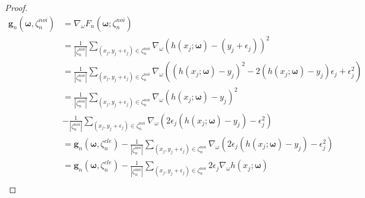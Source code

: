 \begin{proof}
\begin{equation}\label{Gradient of noise loss}
\begin{aligned}
\boldsymbol{g}_n\left(\boldsymbol{\omega},\zeta_n^{noi}\right)&=\nabla_\omega F_n\left(\boldsymbol{\omega};\zeta_n^{noi}\right)\\
&=\frac{1}{|\zeta_n^{noi}|}\sum_{\left(x_j,y_j+\epsilon_j\right)\in \zeta_n^{noi}} \nabla_\omega \left(h\left(x_j;\boldsymbol{\omega}\right)-\left(y_j+\epsilon_j\right)\right)^2\\
&=\frac{1}{|\zeta_n^{noi}|}\sum_{\left(x_j,y_j+\epsilon_j\right)\in \zeta_n^{noi}}\nabla_\omega \left(\left(h\left(x_j;\boldsymbol{\omega}\right)-y_j\right)^2-2\left(h\left(x_j;\boldsymbol{\omega}\right)-y_j\right)\epsilon_j+\epsilon_j^2\right)\\
&=\frac{1}{|\zeta_n^{noi}|}\sum_{\left(x_j,y_j+\epsilon_j\right)\in \zeta_n^{noi}}\nabla_\omega \left(h\left(x_j;\boldsymbol{\omega}\right)-y_j\right)^2\\
&-\frac{1}{|\zeta_n^{noi}|}\sum_{\left(x_j,y_j+\epsilon_j\right)\in \zeta_n^{noi}}\nabla_\omega \left(2\epsilon_j\left(h\left(x_j;\boldsymbol{\omega}\right)-y_j\right)-\epsilon_j^2\right)\\
&=\boldsymbol{g}_n\left(\boldsymbol{\omega},\zeta_n^{cle}\right)-\frac{1}{|\zeta_n^{noi}|}\sum_{\left(x_j,y_j+\epsilon_j\right)\in \zeta_n^{noi}}\nabla_\omega \left(2\epsilon_j\left(h\left(x_j;\boldsymbol{\omega}\right)-y_j\right)-\epsilon_j^2\right)\\
&=\boldsymbol{g}_n\left(\boldsymbol{\omega},\zeta_n^{cle}\right)-\frac{1}{|\zeta_n^{noi}|}\sum_{\left(x_j,y_j+\epsilon_j\right)\in \zeta_n^{noi}}2\epsilon_j\nabla_\omega  h\left(x_j;\boldsymbol{\omega}\right)\\
\end{aligned}
\end{equation}
\end{proof}

